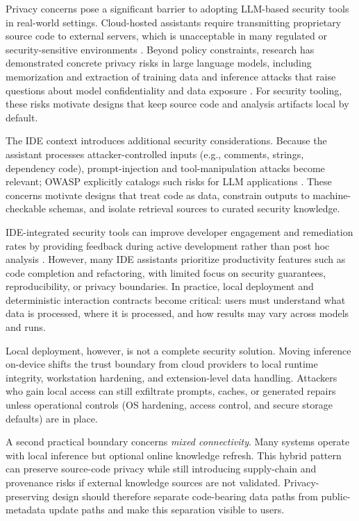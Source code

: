 Privacy concerns pose a significant barrier to adopting LLM-based security tools in real-world settings. Cloud-hosted assistants require transmitting proprietary source code to external servers, which is unacceptable in many regulated or security-sensitive environments \cite{gdpr2016}. Beyond policy constraints, research has demonstrated concrete privacy risks in large language models, including memorization and extraction of training data \cite{carlini2021extracting} and inference attacks that raise questions about model confidentiality and data exposure \cite{shokri2017membership}. For security tooling, these risks motivate designs that keep source code and analysis artifacts local by default.

The IDE context introduces additional security considerations. Because the assistant processes attacker-controlled inputs (e.g., comments, strings, dependency code), prompt-injection and tool-manipulation attacks become relevant; OWASP explicitly catalogs such risks for LLM applications \cite{owaspLLMTop10_2023}. These concerns motivate designs that treat code as data, constrain outputs to machine-checkable schemas, and isolate retrieval sources to curated security knowledge.

IDE-integrated security tools can improve developer engagement and remediation rates by providing feedback during active development rather than post hoc analysis \cite{johnson2013don,christakis2016developers}. However, many IDE assistants prioritize productivity features such as code completion and refactoring, with limited focus on security guarantees, reproducibility, or privacy boundaries. In practice, local deployment and deterministic interaction contracts become critical: users must understand what data is processed, where it is processed, and how results may vary across models and runs.

Local deployment, however, is not a complete security solution. Moving inference on-device shifts the trust boundary from cloud providers to local runtime integrity, workstation hardening, and extension-level data handling. Attackers who gain local access can still exfiltrate prompts, caches, or generated repairs unless operational controls (OS hardening, access control, and secure storage defaults) are in place.

A second practical boundary concerns \emph{mixed connectivity}. Many systems operate with local inference but optional online knowledge refresh. This hybrid pattern can preserve source-code privacy while still introducing supply-chain and provenance risks if external knowledge sources are not validated. Privacy-preserving design should therefore separate code-bearing data paths from public-metadata update paths and make this separation visible to users.

